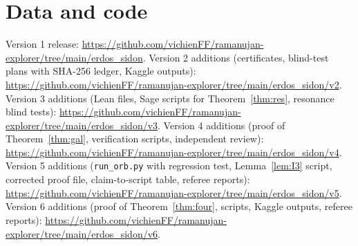 \documentclass[11pt]{article}
\begin{document}
\section*{Data and code}
Version 1 release: \url{https://github.com/vichienFF/ramanujan-explorer/tree/main/erdos_sidon}. Version 2 additions (certificates,
blind-test plans with SHA-256 ledger, Kaggle outputs): \url{https://github.com/vichienFF/ramanujan-explorer/tree/main/erdos_sidon/v2}. Version 3 additions (Lean files, Sage scripts for Theorem~\ref{thm:res}, resonance blind tests): \url{https://github.com/vichienFF/ramanujan-explorer/tree/main/erdos_sidon/v3}. Version 4 additions (proof of Theorem~\ref{thm:gal}, verification scripts, independent review): \url{https://github.com/vichienFF/ramanujan-explorer/tree/main/erdos_sidon/v4}. Version 5 additions (\texttt{run\_orb.py} with regression test, Lemma~\ref{lem:I3} script, corrected proof file, claim-to-script table, referee reports): \url{https://github.com/vichienFF/ramanujan-explorer/tree/main/erdos_sidon/v5}. Version 6 additions (proof of Theorem~\ref{thm:four}, scripts, Kaggle outputs, referee reports): \url{https://github.com/vichienFF/ramanujan-explorer/tree/main/erdos_sidon/v6}.
\end{document}
